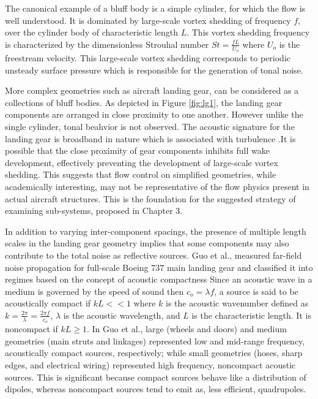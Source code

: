 The canonical example of a bluff body is a simple cylinder, for which the flow is well understood. It is dominated by large-scale vortex shedding of frequency $f$, over the cylinder body of characteristic length $L$. This vortex shedding frequency is characterized by the dimensionless Strouhal number $St = \frac{fL}{U_o}$ where $U_o $ is the freestream velocity. This large-scale vortex shedding corresponds to periodic unsteady surface pressure which is responsible for the generation of tonal noise. 
    
More complex geometries such as aircraft landing gear, can be considered as a collections of bluff bodies. As depicted in Figure \ref{fig:lg1}, the landing gear components are arranged in close proximity to one another. However unlike the single cylinder, tonal beahvior is not observed. The acoustic signature for the landing gear is broadband in nature which is associated with turbulence \cite{zawodny2009}.It is possible that the close proximity of gear components inhibits full wake development, effectively preventing the development of large-scale vortex shedding. This suggests that flow control on simplified geometries, while academically interesting, may not be representative of the flow physics present in actual aircraft structures. This is the foundation for the suggested strategy of examining sub-systems, proposed in Chapter 3. 

In addition to varying inter-component spacings, the presence of multiple length scales in the landing gear geometry implies that some components may also contribute to the total noise as reflective sources. Guo et al., measured far-field noise propagation for full-scale Boeing 737 main landing gear and classified it into regimes based on the concept of acoustic compactness \cite{guo2006} Since an acoustic wave in a medium is governed by the speed of sound then $c_o = \lambda f$, a source is said to be acoustically compact if $kL << 1$ where $k$ is the acoustic wavenumber defined as $k = \frac{2 \pi}{\lambda} = \frac{2 \pi f}{c_o}$, $\lambda$ is the acoustic wavelength, and $L$ is the characteristic length. It is noncompact if $kL \geq 1$. In Guo et al., large (wheels and doors) and medium geometries (main struts and linkages) represented low and mid-range frequency, acoustically compact sources, respectively; while small geometries (hoses, sharp edges, and electrical wiring) represented high frequency, noncompact acoustic sources. This is significant because compact sources behave like a distribution of dipoles, whereas noncompact sources tend to emit as, less efficient, quadrupoles. 

